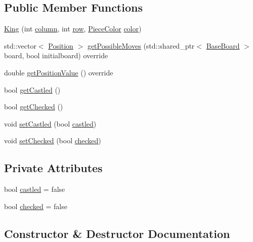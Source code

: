 \subsection*{Public Member Functions}
\begin{DoxyCompactItemize}
\item 
\hyperlink{class_king_addeee144a4a5076e903652de9ad2f2ce}{King} (int \hyperlink{class_piece_aa8f39e11280395103164f6ae07398c82}{column}, int \hyperlink{class_piece_ac6ef7c474f20562cb629c2452ce0631d}{row}, \hyperlink{_piece_8h_ad7595c48bb74c0dd2a7648712a2d4985}{Piece\+Color} \hyperlink{class_piece_a8dfe0501fe95a1a7618cf5ad3b9fda69}{color})
\item 
std\+::vector$<$ \hyperlink{struct_position}{Position} $>$ \hyperlink{class_king_aa8adeaff952af3bf16ebc1c1c0699d43}{get\+Possible\+Moves} (std\+::shared\+\_\+ptr$<$ \hyperlink{class_base_board}{Base\+Board} $>$ board, bool initialboard) override
\item 
double \hyperlink{class_king_a047413f5f6df784b2fd308f20e356ea4}{get\+Position\+Value} () override
\item 
bool \hyperlink{class_king_a7f58cb2d7d005f03d229af195136b00a}{get\+Castled} ()
\item 
bool \hyperlink{class_king_aecc7387c9b2d6e94b556d416b985b210}{get\+Checked} ()
\item 
void \hyperlink{class_king_a144a81bb4358863415ff41ff851fdbd4}{set\+Castled} (bool \hyperlink{class_king_af1d6712d05b377b1989d7625e5aceb38}{castled})
\item 
void \hyperlink{class_king_af55ffa8c550debf65d6b64a91472626b}{set\+Checked} (bool \hyperlink{class_king_afd51388c6257f775868f8bde25591a31}{checked})
\end{DoxyCompactItemize}
\subsection*{Private Attributes}
\begin{DoxyCompactItemize}
\item 
bool \hyperlink{class_king_af1d6712d05b377b1989d7625e5aceb38}{castled} = false
\item 
bool \hyperlink{class_king_afd51388c6257f775868f8bde25591a31}{checked} = false
\end{DoxyCompactItemize}


\subsection{Constructor \& Destructor Documentation}
\mbox{\label{class_king_addeee144a4a5076e903652de9ad2f2ce}} 

